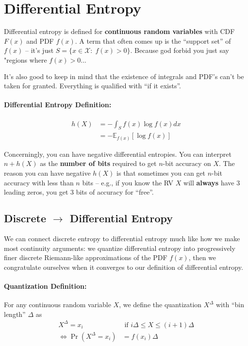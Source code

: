 \documentclass[a4paper,12pt]{report}
\begin{document}
\section{Differential Entropy}

Differential entropy is defined for \textbf{continuous random variables} with
CDF $F(x)$ and PDF $f(x)$. A term that often comes up is the ``support set'' of
$f(x)$ -- it's just $S = \{x\in \mathcal X : \; f(x) > 0\}$. Because god forbid you
just say "regions where $f(x)>0$...

It's also good to keep in mind that the existence of integrals and PDF's can't
be taken for granted. Everything is qualified with ``if it exists''. 


\paragraph{Differential Entropy Definition: } 
\begin{align}
	h(X) &= - \int_{S} f(x) \log f(x) dx \\ 
		 &= - \mathbb E_{f(x)} [\log f(x)] 
\end{align}

Concerningly, you can have negative differential entropies. You can interpret
$n+h(X)$ as the \textbf{number of bits} required to get $n$-bit accuracy on $X$.
The reason you can have negative $h(X)$ is that sometimes you can get $n$-bit
accuracy with less than $n$ bits -- e.g., if you know the RV $X$ will
\textbf{always} have 3 leading zeros, you get 3 bits of accuracy for ``free''. 


\subsection{Discrete $\to$ Differential Entropy}

We can connect discrete entropy to differential entropy much like how we make
most continuity arguments: we quantize differential entropy into progressively
finer discrete Riemann-like approximations of the PDF $f(x)$, then we
congratulate ourselves when it converges to our definition of differential
entropy.

\paragraph{Quantization Definition: } For any continuous random variable $X$, we
define the quantization $X^\Delta$ with ``bin length'' $\Delta$ as 
\begin{align}
	X^\Delta = x_i &\text{ if } i \Delta \leq X \leq (i+1)\Delta \\
	\iff \Pr(X^\Delta = x_i) &= f(x_i) \Delta 
\end{align}
\end{document}
